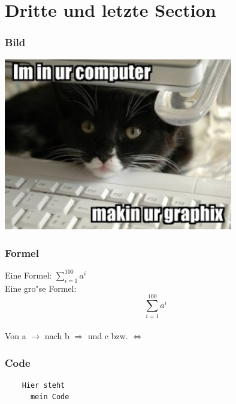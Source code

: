 \documentclass{beamer}
\begin{document}
\section{Dritte und letzte Section}
\begin{frame}
 \frametitle{Bild}
 	\begin{center}
		\includegraphics[width=0.75\textwidth]{Images/lolcat-sample.jpg}
	\end{center}
\end{frame}
\begin{frame}
 \frametitle{Formel}
	Eine Formel: $\sum_{i=1}^{100} a ^ i$
	\\
	\pause
	Eine gro"se Formel: $$ \sum_{i=1}^{100} a ^ i $$ \\
	\pause
	Von a $\rightarrow$ nach b $\Rightarrow$ und c bzw. $\Leftrightarrow$
\end{frame}
\begin{frame}[fragile]	%
 \frametitle{Code}

 \begin{verbatim}
	Hier steht
	  mein Code
 \end{verbatim}
 
\end{frame}
\end{document}
